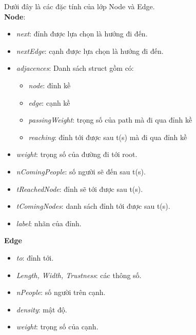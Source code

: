     Dưới đây là các đặc tính của lớp Node và Edge. \\ 
    \textbf{Node}: 
    \begin{itemize}
        \item \textit{next}: đỉnh được lựa chọn là hướng đi đến.
        \item \textit{nextEdge}: cạnh được lựa chọn là hướng đi đến.
        \item \textit{adjacences}: Danh sách struct gồm có:
        \begin{itemize}
            \item \textit{node}: đỉnh kề
            \item \textit{edge}: cạnh kề
            \item \textit{passingWeight}: trọng số của path mà đi qua đỉnh kề 
            \item \textit{reaching}: đỉnh tới được sau t(s) mà đi qua đỉnh 
            kề
        \end{itemize}    
        \item \textit{weight}: trọng số của đường đi tới root.
        \item \textit{nComingPeople}: số người sẽ đến sau t(s).
        \item \textit{tReachedNode}: đỉnh sẽ tới được sau t(s).
        \item \textit{tComingNodes}: danh sách đỉnh tới được sau t(s).
        \item \textit{label}: nhãn của đỉnh.
    \end{itemize}
    \textbf{Edge}
    \begin{itemize}
        \item \textit{to}: đỉnh tới.
        \item \textit{Length, Width, Trustness}: các thông số.
        \item \textit{nPeople}: số người trên cạnh.
        \item \textit{density}: mật độ.
        \item \textit{weight}: trọng số của cạnh.
    \end{itemize}
